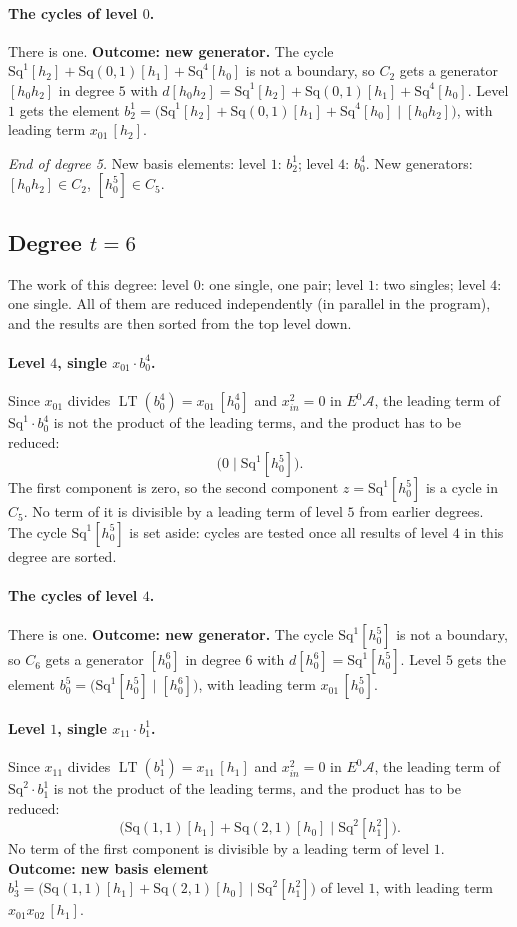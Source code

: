 \documentclass[11pt]{article}
\newcommand{\Sq}{\mathrm{Sq}}
\newcommand{\A}{\mathcal{A}}
\DeclareMathOperator{\LT}{LT}
\begin{document}
\paragraph{The cycles of level $0$.} There is one.
\textbf{Outcome: new generator.} The cycle $\Sq^{1}[h_2] + \Sq(0,1)[h_1] + \Sq^{4}[h_0]$ is not a boundary, so $C_{2}$ gets a generator $[h_0h_2]$ in degree $5$ with $d[h_0h_2] = \Sq^{1}[h_2] + \Sq(0,1)[h_1] + \Sq^{4}[h_0]$.
Level $1$ gets the element $b^{1}_{2} = \bigl(\Sq^{1}[h_2] + \Sq(0,1)[h_1] + \Sq^{4}[h_0] \;\big|\; [h_0h_2]\bigr)$, with leading term $x_{01}\,[h_2]$.
\medskip
\par\noindent\emph{End of degree 5.} New basis elements: level $1$: $b^{1}_{2}$; level $4$: $b^{4}_{0}$. New generators: $[h_0h_2]\in C_{2}$, $[h_0^5]\in C_{5}$.
\subsection*{Degree $t = 6$}
\noindent The work of this degree: level $0$: one single, one pair; level $1$: two singles; level $4$: one single. All of them are reduced independently (in parallel in the program), and the results are then sorted from the top level down.
\medskip
\paragraph{Level $4$, single $x_{01}\cdot b^{4}_{0}$.} Since $x_{01}$ divides $\LT(b^{4}_{0}) = x_{01}\,[h_0^4]$ and $x_{in}^2 = 0$ in $E^0\A$, the leading term of $\Sq^{1}\cdot b^{4}_{0}$ is not the product of the leading terms, and the product has to be reduced:
\[\bigl(0 \;\big|\; \Sq^{1}[h_0^5]\bigr).\]
The first component is zero, so the second component $z = \Sq^{1}[h_0^5]$ is a cycle in $C_{5}$.
No term of it is divisible by a leading term of level $5$ from earlier degrees.
The cycle $\Sq^{1}[h_0^5]$ is set aside: cycles are tested once all results of level $4$ in this degree are sorted.
\medskip
\paragraph{The cycles of level $4$.} There is one.
\textbf{Outcome: new generator.} The cycle $\Sq^{1}[h_0^5]$ is not a boundary, so $C_{6}$ gets a generator $[h_0^6]$ in degree $6$ with $d[h_0^6] = \Sq^{1}[h_0^5]$.
Level $5$ gets the element $b^{5}_{0} = \bigl(\Sq^{1}[h_0^5] \;\big|\; [h_0^6]\bigr)$, with leading term $x_{01}\,[h_0^5]$.
\medskip
\paragraph{Level $1$, single $x_{11}\cdot b^{1}_{1}$.} Since $x_{11}$ divides $\LT(b^{1}_{1}) = x_{11}\,[h_1]$ and $x_{in}^2 = 0$ in $E^0\A$, the leading term of $\Sq^{2}\cdot b^{1}_{1}$ is not the product of the leading terms, and the product has to be reduced:
\[\bigl(\Sq(1,1)[h_1] + \Sq(2,1)[h_0] \;\big|\; \Sq^{2}[h_1^2]\bigr).\]
No term of the first component is divisible by a leading term of level $1$.
\textbf{Outcome: new basis element} $b^{1}_{3} = \bigl(\Sq(1,1)[h_1] + \Sq(2,1)[h_0] \;\big|\; \Sq^{2}[h_1^2]\bigr)$ of level $1$, with leading term $x_{01}x_{02}\,[h_1]$.
\medskip
\end{document}

